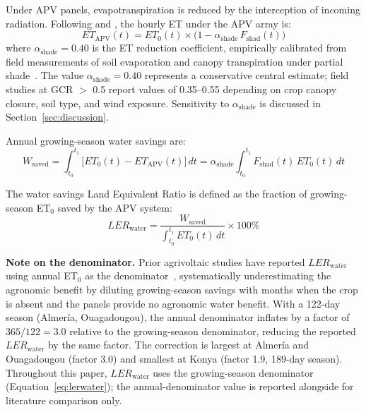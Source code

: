 Under APV panels, evapotranspiration is reduced by the interception
of incoming radiation. Following \citet{elamri2018} and
\citet{tawassulli2025}, the hourly ET under the APV array is:
\begin{equation}
    ET_{\text{APV}}(t) = ET_0(t)
        \times \bigl(1 - \alpha_{\text{shade}}\,F_{\text{shad}}(t)\bigr)
    \label{eq:etapv}
\end{equation}
where $\alpha_{\text{shade}} = 0.40$ is the ET reduction coefficient,
empirically calibrated from field measurements of soil evaporation
and canopy transpiration under partial shade~\citep{elamri2018,
tawassulli2025}. The value $\alpha_{\text{shade}} = 0.40$ represents
a conservative central estimate; field studies at GCR $>$ 0.5 report
values of 0.35--0.55 depending on crop canopy closure, soil type, and
wind exposure. Sensitivity to $\alpha_{\text{shade}}$ is discussed in
Section~\ref{sec:discussion}.

Annual growing-season water savings are:
\begin{equation}
    W_{\text{saved}} = \int_{t_0}^{t_1}
        \bigl[ET_0(t) - ET_{\text{APV}}(t)\bigr]\,dt
        = \alpha_{\text{shade}}\int_{t_0}^{t_1}
        F_{\text{shad}}(t)\,ET_0(t)\,dt
    \label{eq:wsaved}
\end{equation}

The water savings Land Equivalent Ratio is defined as the fraction
of growing-season ET$_0$ saved by the APV system:
\begin{equation}
    LER_{\text{water}} =
        \frac{W_{\text{saved}}}
             {\displaystyle\int_{t_0}^{t_1} ET_0(t)\,dt}
        \times 100\%
    \label{eq:lerwater}
\end{equation}

\textbf{Note on the denominator.} Prior agrivoltaic studies
have reported $LER_{\text{water}}$ using annual ET$_0$ as the
denominator~\citep{barron2019, elamri2018}, systematically
underestimating the agronomic benefit by diluting growing-season
savings with months when the crop is absent and the panels provide
no agronomic water benefit. With a 122-day season (Almer\'{i}a,
Ouagadougou), the annual denominator inflates by a factor of
$365/122 = 3.0$ relative to the growing-season denominator,
reducing the reported $LER_{\text{water}}$ by the same factor.
The correction is largest at Almer\'{i}a and Ouagadougou (factor
3.0) and smallest at Konya (factor 1.9, 189-day season). Throughout
this paper, $LER_{\text{water}}$ uses the growing-season denominator
(Equation~\ref{eq:lerwater}); the annual-denominator value is
reported alongside for literature comparison only.

